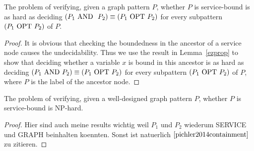 \begin{corollary}
	The problem of verifying, given a graph pattern $P$, whether $P$ is
	service-bound is as hard as deciding $(P_1 \mbox{ AND } \ P_2)
	\equiv (P_1 \mbox{ OPT }  P_2)$ for every subpattern $(P_1 \mbox{ OPT } P_2)$ of $P$.
\end{corollary}
\begin{proof}
	It is obvious that checking the boundedness in the ancestor of a service
	node causes the undecidability. Thus we use the result in Lemma~\ref{ezprop} to
	show that deciding whether a variable $x$ is bound in this ancestor is as
	hard as deciding $(P_1 \mbox{ AND } P_2)
	\equiv (P_1 \mbox{ OPT }  P_2)$ for every subpattern $(P_1 \mbox{ OPT } P_2)$ of $P$, where
	$P$ is the label of the ancestor node.
\end{proof}
\begin{corollary}
	The problem of verifying, given a well-designed graph pattern $P$, whether $P$ is
	service-bound is NP-hard.
\end{corollary}
\begin{proof}
	Hier sind auch meine results wichtig weil $P_1$ und $P_2$ wiederum SERVICE
	und GRAPH beinhalten koennten. Sonst ist natuerlich
	$\cite{pichler2014containment}$ zu zitieren.
\end{proof}


